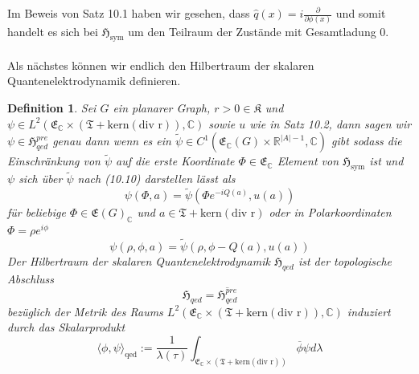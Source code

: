 \documentclass[11pt,a4paper,leqno]{report}
\newtheorem{definition}[theorem]{Definition}
\numberwithin{equation}{chapter}
\begin{document}
\noindent
Im Beweis von Satz 10.1 haben wir gesehen, dass $\hat{q}(x)=i\frac{\partial}{\partial\phi(x)}$ und somit handelt es sich bei $\mathfrak{H}_{\text{sym}}$ um den Teilraum der Zust\"ande mit Gesamtladung 0.\\
\\
Als n\"achstes k\"onnen wir endlich den Hilbertraum der skalaren Quantenelektrodynamik definieren.
\begin{definition}
	Sei $G$ ein planarer Graph, $r>0\in\mathfrak{K}$ und $\psi\in L^2(\mathfrak{E}_{\mathbb{C}}\times(\mathfrak{T}+\text{kern}(\text{div r})),\mathbb{C})$ sowie $u$ wie in Satz 10.2, dann sagen wir $\psi\in \mathfrak{H}_{qed}^{pre}$ genau dann wenn es ein $\tilde{\psi}\in C^1(\mathfrak{E}_\mathbb{C}(G)\times\mathbb{R}^{|A|-1}, \mathbb{C})$ gibt sodass die Einschr\"ankung von $\tilde{\psi}$ auf die erste Koordinate $\Phi\in \mathfrak{E}_\mathbb{C}$ Element von $\mathfrak{H}_\text{sym}$ ist und $\psi$ sich \"uber $\tilde{\psi}$ nach (10.10) darstellen l\"asst als
	\begin{equation}
		\psi(\Phi, a) = \tilde{\psi}(\Phi e^{-iQ(a)}, u(a))
	\end{equation}
	f\"ur beliebige $\Phi\in\mathfrak{E}(G)_{\mathbb{C}}$ und $a\in\mathfrak{T}+\text{kern}(\text{div r})$ oder in Polarkoordinaten $\Phi = \rho e^{i\phi}$
	\begin{equation}
	\psi(\rho, \phi, a) = \tilde{\psi}(\rho, \phi-Q(a), u(a))
\end{equation}
Der Hilbertraum der skalaren Quantenelektrodynamik $\mathfrak{H}_{qed}$ ist der topologische Abschluss  
\begin{equation*}
	\mathfrak{H}_{qed} = \overline{\mathfrak{H}_{qed}^{pre}}
\end{equation*}
bez\"uglich der Metrik des Raums $L^2(\mathfrak{E}_{\mathbb{C}}\times(\mathfrak{T}+\text{kern}(\text{div r})),\mathbb{C})$ induziert durch das Skalarprodukt
\begin{equation}
	\langle \phi, \psi\rangle_{\text{qed}} := \frac{1}{\lambda(\tau)}\int_{\mathfrak{E}_{\mathbb{C}}\times(\mathfrak{T}+\text{kern}(\text{div r}))}\overline{\phi}\psi d\lambda
\end{equation}
\end{definition}
\end{document}
